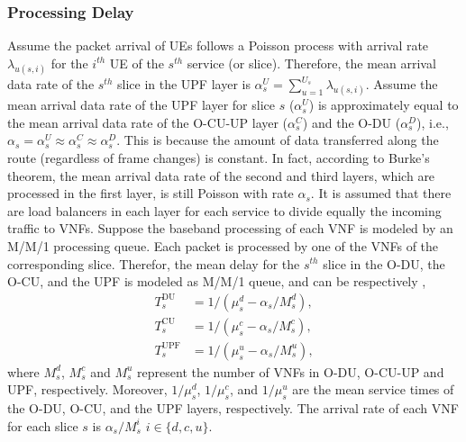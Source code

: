 \documentclass[lettersize,journal]{IEEEtran}
\begin{document}
\subsubsection{Processing Delay}
Assume the packet arrival of UEs follows a Poisson process with arrival rate $\lambda_{u(s,i)}$ for the $i^{th}$ UE of the $s^{th}$ service (or slice).
Therefore, the mean arrival data rate of the $s^{th}$ slice in the UPF layer is $\alpha_{s}^U = \sum_{u=1}^{U_s}\lambda_{u(s,i)}$.
Assume the mean arrival data rate of the UPF layer for slice $s$ ($\alpha_{s}^U$) is approximately equal to the mean arrival data rate of the O-CU-UP layer ($\alpha_{s}^C$) and the O-DU ($\alpha_{s}^D$), i.e., $\alpha_{s} =\alpha_{s}^U \approx \alpha_{s}^C \approx \alpha_{s}^D$. This is because the amount of data transferred along the route (regardless of frame changes) is constant.
In fact, according to Burke’s theorem, the mean arrival data rate of the second and third layers, which are processed in the first layer, is still Poisson with rate $\alpha_{s}$.
It is assumed that there are load balancers in each layer for each service to divide equally the incoming traffic to VNFs. %
Suppose the baseband processing of each VNF is modeled by an M/M/1 processing queue.
Each packet is processed by one of the VNFs of the corresponding slice. Therefor, the mean delay for the $s^{th}$ slice in the O-DU, the O-CU, and the UPF is modeled as M/M/1 queue, and can be respectively \cite{SystemCostMinimization,luong2018joint,luong2018novel},
\begin{align}
T_{s}^{\text{DU}} &= 1/(\mu_s^d - \alpha_{s}/{M_s^{d}}),\\
T_{s}^{\text{CU}} &= 1/(\mu_s^c - \alpha_{s}/{M_s^{c}}),\\
T_{s}^{\text{UPF}} &= 1/(\mu_s^u - \alpha_{s}/{M_s^{u}}),
\end{align}
where $M_s^{d}$, $M_s^{c}$ and
$M_s^{u}$ represent the number of VNFs in O-DU, O-CU-UP and UPF, respectively.
Moreover, $1/\mu_s^d$, $1/\mu_s^c$, and $1/\mu_s^u$ are the mean service times of the O-DU, O-CU, and the UPF layers, respectively. The arrival rate of each VNF for each slice
$s$ is $\alpha_{s}/{M_s^{i}}$ $ i \in \{d,c, u\}$.
\end{document}
